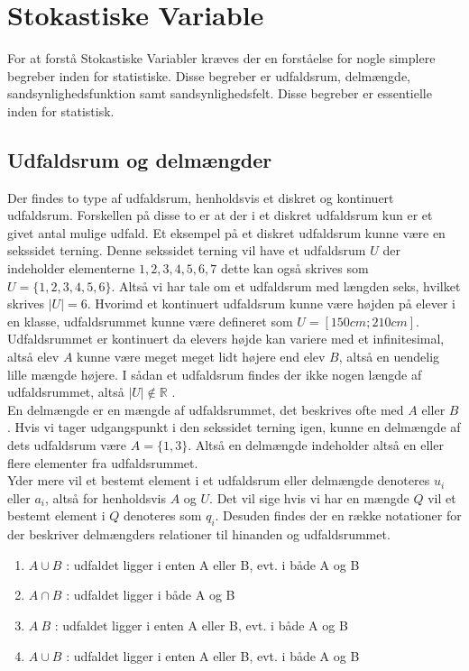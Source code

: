 \documentclass[../../SRP.tex]{subfiles}
\begin{document}
\chapter{Stokastiske Variable}

For at forstå Stokastiske Variabler kræves der en forståelse for nogle simplere begreber inden for statistiske. Disse begreber er udfaldsrum, delmængde, sandsynlighedsfunktion samt sandsynlighedsfelt. Disse begreber er essentielle inden for statistisk.

\section{Udfaldsrum og delmængder}

Der findes to type af udfaldsrum, henholdsvis et diskret og kontinuert udfaldsrum. Forskellen på disse to er at der i et diskret udfaldsrum kun er et givet antal mulige udfald. Et eksempel på et diskret udfaldsrum kunne være en sekssidet terning. Denne sekssidet terning vil have et udfaldsrum $U$ der indeholder elementerne $1,2,3,4,5,6,7$ dette kan også skrives som $U = \{1,2,3,4,5,6\}$. Altså vi har tale om et udfaldsrum med længden seks, hvilket skrives $|U| = 6$. Hvorimd et kontinuert udfaldsrum kunne være højden på elever i en klasse, udfaldsrummet kunne være defineret som $U = [150cm;210cm]$. Udfaldsrummet er kontinuert da elevers højde kan variere med et infinitesimal, altså elev $A$ kunne være meget meget lidt højere end elev $B$, altså en uendelig lille mængde højere. I sådan et udfaldsrum findes der ikke nogen længde af udfaldsrummet, altså $|U| \notin \mathbb{R}$ \cite{SC}. \\

En delmængde er en mængde af udfaldsrummet, det beskrives ofte med $A$ eller $B$. Hvis vi tager udgangspunkt i den sekssidet terning igen, kunne en delmængde af dets udfaldsrum være $A = \{1,3\}$. Altså en delmængde indeholder altså en eller flere elementer fra udfaldsrummet. \\

Yder mere vil et bestemt element i et udfaldsrum eller delmængde denoteres $u_i$ eller $a_i$, altså for henholdsvis $A$ og $U$. Det vil sige hvis vi har en mængde $Q$ vil et bestemt element i $Q$ denoteres som $q_i$. Desuden findes der en række notationer for der beskriver delmængders relationer til hinanden og udfaldsrummet.
\begin{enumerate}
  \item $A \cup B$ : udfaldet ligger i enten A eller B, evt. i både A og B
  \item $A \cap B$ : udfaldet ligger i både A og B
  \item $A \ B$ : udfaldet ligger i enten A eller B, evt. i både A og B
  \item $A \cup B$ : udfaldet ligger i enten A eller B, evt. i både A og B
\end{enumerate}
\end{document}
